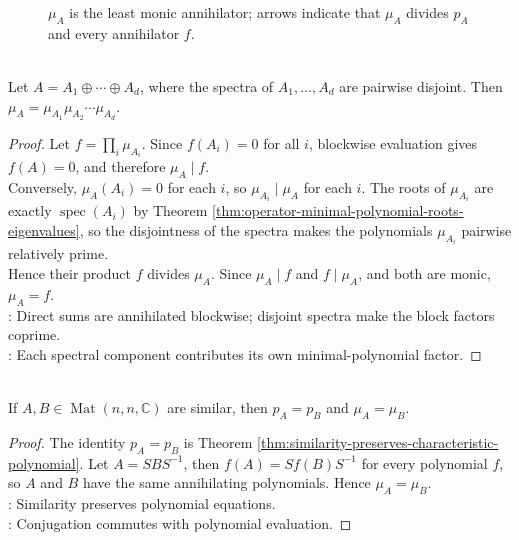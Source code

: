 \begin{figure}[H]
  \centering
  
  \caption{$\mu_A$ is the least monic annihilator; arrows indicate that $\mu_A$ divides $p_A$ and every annihilator $f$.}
  \label{fig:minimal-polynomial-divisibility}
\end{figure}

\begin{theorem} \label{thm:minimal-polynomial-direct-sum-disjoint-spectra} \\
Let $A=A_1\oplus\cdots\oplus A_d$, where the spectra of $A_1,\ldots,A_d$ are pairwise disjoint. Then $\mu_A=\mu_{A_1}\mu_{A_2}\cdots\mu_{A_d}$.
\begin{proof}
Let $f=\prod\limits_i\mu_{A_i}$. Since $f(A_i)=0$ for all $i$, blockwise evaluation gives $f(A)=0$, and therefore $\mu_A\mid f$.\\
Conversely, $\mu_A(A_i)=0$ for each $i$, so $\mu_{A_i}\mid\mu_A$ for each $i$. The roots of $\mu_{A_i}$ are exactly $\operatorname{spec}(A_i)$ by Theorem \ref{thm:operator-minimal-polynomial-roots-eigenvalues}, so the disjointness of the spectra makes the polynomials $\mu_{A_i}$ pairwise relatively prime.\\
Hence their product $f$ divides $\mu_A$. Since $\mu_A\mid f$ and $f\mid\mu_A$, and both are monic, $\mu_A=f$.\\
: Direct sums are annihilated blockwise; disjoint spectra make the block factors coprime.\\
: Each spectral component contributes its own minimal-polynomial factor.
\end{proof}
\end{theorem}

\begin{theorem} \label{thm:similarity-preserves-minimal-polynomial} \\
If $A,B\in\operatorname{Mat}(n,n,\mathbb{C})$ are similar, then $p_A=p_B$ and $\mu_A=\mu_B$.
\begin{proof}
The identity $p_A=p_B$ is Theorem \ref{thm:similarity-preserves-characteristic-polynomial}. Let $A=SBS^{-1}$, then $f(A)=Sf(B)S^{-1}$ for every polynomial $f$, so $A$ and $B$ have the same annihilating polynomials. Hence $\mu_A=\mu_B$.\\
: Similarity preserves polynomial equations.\\
: Conjugation commutes with polynomial evaluation.
\end{proof}
\end{theorem}

